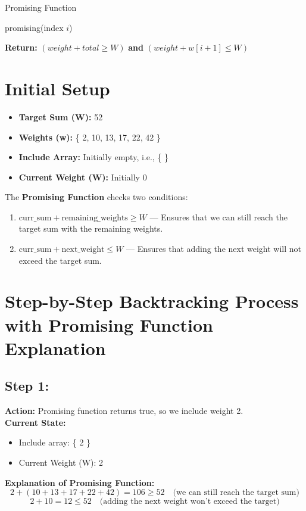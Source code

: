 \documentclass[12pt]{article}
\begin{document}
Promising Function

\begin{algorithm}
    \caption{promising(index $i$)}
    \begin{algorithmic}[1]
        \State \textbf{Return:} $(weight + total \geq W)$ \textbf{and} $(weight + w[i+1] \leq W)$
    \end{algorithmic}
\end{algorithm}
\section*{Initial Setup}

\begin{itemize}
    \item \textbf{Target Sum (W):} 52
    \item \textbf{Weights (w):} \{ 2, 10, 13, 17, 22, 42 \}
    \item \textbf{Include Array:} Initially empty, i.e., \{ \}
    \item \textbf{Current Weight (W):} Initially 0
\end{itemize}

The \textbf{Promising Function} checks two conditions:
\begin{enumerate}
    \item \( \text{curr\_sum} + \text{remaining\_weights} \geq W \) — Ensures that we can still reach the target sum with the remaining weights.
    \item \( \text{curr\_sum} + \text{next\_weight} \leq W \) — Ensures that adding the next weight will not exceed the target sum.
\end{enumerate}

\section*{Step-by-Step Backtracking Process with Promising Function Explanation}

\subsection*{Step 1:}
\textbf{Action:} Promising function returns true, so we include weight 2. \\
\textbf{Current State:} 
\begin{itemize}
    \item Include array: \{ 2 \}
    \item Current Weight (W): 2
\end{itemize}
\textbf{Explanation of Promising Function:}
\[
2 + (10 + 13 + 17 + 22 + 42) = 106 \geq 52 \quad \text{(we can still reach the target sum)}
\]
\[
2 + 10 = 12 \leq 52 \quad \text{(adding the next weight won't exceed the target)}
\]
\end{document}
